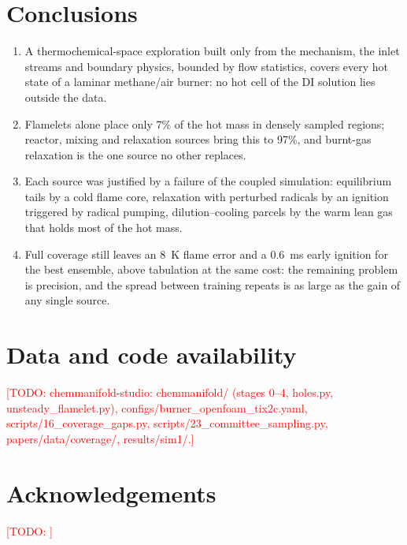 \documentclass[preprint,review,12pt]{elsarticle}
\newcommand{\todo}[1]{\textcolor{red}{[TODO: #1]}}
\begin{document}
\section{Conclusions}
\begin{enumerate}
\item A thermochemical-space exploration built only from the mechanism, the inlet streams and boundary physics, bounded
  by flow statistics, covers every hot state of a laminar methane/air burner: no hot cell of the DI solution lies
  outside the data.
\item Flamelets alone place only 7\% of the hot mass in densely sampled regions; reactor, mixing and relaxation sources
  bring this to 97\%, and burnt-gas relaxation is the one source no other replaces.
\item Each source was justified by a failure of the coupled simulation: equilibrium tails by a cold flame core,
  relaxation with perturbed radicals by an ignition triggered by radical pumping, dilution--cooling parcels by the warm
  lean gas that holds most of the hot mass.
\item Full coverage still leaves an 8~K flame error and a 0.6~ms early ignition for the best ensemble, above tabulation at
  the same cost: the remaining problem is precision, and the spread between training repeats is as large as the gain of
  any single source.
\end{enumerate}

\section*{Data and code availability}
\todo{chemmanifold-studio: chemmanifold/ (stages 0--4, holes.py, unsteady\_flamelet.py), configs/burner\_openfoam\_tix2c.yaml,
scripts/16\_coverage\_gaps.py, scripts/23\_committee\_sampling.py, papers/data/coverage/, results/sim1/.}

\section*{Acknowledgements}
\todo{}



\end{document}
